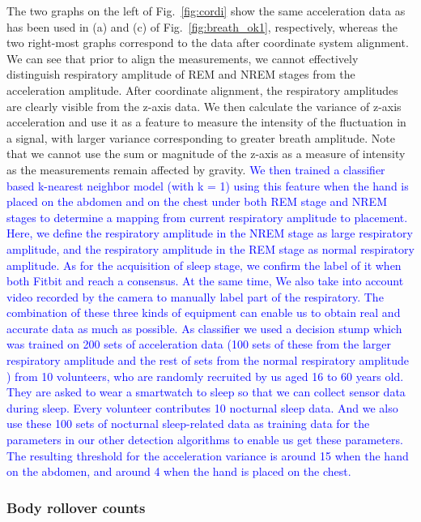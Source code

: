 The two graphs on the left of Fig.~\ref{fig:cordi} show the same acceleration data as has been used in (a) and (c) of Fig.~\ref{fig:breath_ok1}, respectively, whereas the two right-most graphs correspond to the data after coordinate system alignment.  We can see that prior to align the measurements, we cannot effectively distinguish respiratory amplitude of REM and NREM stages from the acceleration amplitude. After coordinate alignment, the respiratory amplitudes are clearly visible from the z-axis data. We then calculate the variance of z-axis acceleration and use it as a feature to measure the intensity of the fluctuation in a signal, with larger variance corresponding to greater breath amplitude. Note that we cannot use the sum or magnitude of the z-axis as a measure of intensity as the measurements remain affected by gravity. \textcolor{blue}{We then trained a classifier based k-nearest neighbor model (with k = 1) using this feature when the hand is placed on the abdomen and on the chest under both REM stage and NREM stages to determine a mapping from current respiratory amplitude to placement. Here, we define the respiratory amplitude in the NREM stage as large respiratory amplitude, and the respiratory amplitude in the REM stage as normal respiratory amplitude. As for the acquisition of sleep stage, we confirm the label of it when both Fitbit and {\systemname} reach a consensus. At the same time, We also take into account video recorded by the camera to manually label part of the respiratory. The combination of these three kinds of equipment can enable us to obtain real and accurate data as much as possible.  As classifier we used a decision stump which was trained on 200 sets of acceleration data (100 sets of these from the larger respiratory amplitude and the rest of sets from the normal respiratory amplitude ) from 10 volunteers, who are randomly recruited by us aged 16 to 60 years old. They are asked to wear a smartwatch to sleep so that we can collect sensor data during sleep. Every volunteer contributes 10 nocturnal sleep data. And we also use these 100 sets of nocturnal sleep-related data as training data for the parameters in our other detection algorithms to enable us get these parameters. The resulting threshold for the acceleration variance is around 15 when the hand on the abdomen, and around 4 when the hand is placed on the chest.}



\subsubsection{Body rollover counts \label{sec:bodyro}}


